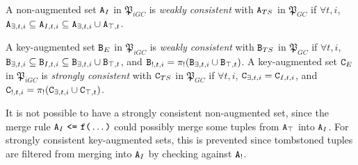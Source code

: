 \begin{property}~

A non-augmented set $\tt{A}_I$ in $\mathfrak{P}_{iGC}$ is \emph{weakly consistent} with $\tt{A}_{TS}$ in $\mathfrak{P}_{GC}$ if $\forall t, i$, $\tt{A}_{\exists,t,i} \subseteq \tt{A}_{I,t,i} \subseteq \tt{A}_{\exists,t,i} \cup \tt{A}_{\top,t}$.

A key-augmented set $\tt{B}_E$ in $\mathfrak{P}_{iGC}$ is \emph{weakly consistent} with $\tt{B}_{TS}$ in $\mathfrak{P}_{GC}$ if $\forall t, i$, $\tt{B}_{\exists,t,i} \subseteq \tt{B}_{I,t,i} \subseteq \tt{B}_{\exists,t,i} \cup \tt{B}_{\top,t}$, and $\tt{B}_{!,t,i} = \pi_!(\tt{B}_{\exists,t,i} \cup \tt{B}_{\top,t})$.
A key-augmented set $\tt{C}_E$ in $\mathfrak{P}_{iGC}$ is \emph{strongly consistent} with $\tt{C}_{TS}$ in $\mathfrak{P}_{GC}$ if $\forall t, i$, $\tt{C}_{\exists,t,i} = \tt{C}_{I,t,i}$, and $\tt{C}_{!,t,i} = \pi_!(\tt{C}_{\exists,t,i} \cup \tt{C}_{\top,t})$.
\end{property}

It is not possible to have a strongly consistent non-augmented set, since the merge rule $\tt{A}_I ~\tt{<=}~ \tt{f}\tt{(}\dots\tt{)}$ could possibly merge some tuples from $\tt{A}_\top$ into $\tt{A}_I$.
For strongly consistent key-augmented sets, this is prevented since tombstoned tuples are filtered from merging into $\tt{A}_I$ by checking against $\tt{A}_!$.


